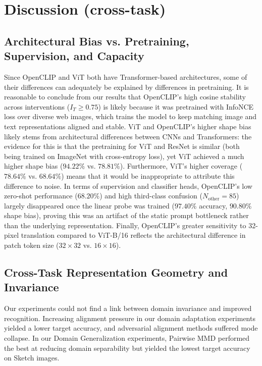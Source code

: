 \documentclass{article}
\begin{document}
\newpage
\section{Discussion (cross-task)}
\label{sec:discussion}

\subsection{Architectural Bias vs. Pretraining, Supervision, and Capacity}
Since OpenCLIP and ViT both have Transformer-based architectures, some of their differences can adequately be explained by differences in pretraining. It is reasonable to conclude from our results that OpenCLIP's high cosine stability across interventions ($I_T \ge 0.75$) is likely because it was pretrained with InfoNCE loss over diverse web images, which trains the model to keep matching image and text representations aligned and stable. ViT and OpenCLIP's higher shape bias likely stems from architectural differences between CNNs and Transformers: the evidence for this is that the pretraining for ViT and ResNet is similar (both being trained on ImageNet with cross-entropy loss), yet ViT achieved a much higher shape bias ($94.22\%$ vs. $78.81\%$). Furthermore, ViT's higher coverage ($78.64\%$ vs. $68.64\%$) means that it would be inappropriate to attribute this difference to noise. In terms of supervision and classifier heads, OpenCLIP's low zero-shot performance ($68.20\%$) and high third-class confusion ($N_{\text{other}}=85$) largely disappeared once the linear probe was trained ($97.40\%$ accuracy, $90.80\%$ shape bias), proving this was an artifact of the static prompt bottleneck rather than the underlying representation. Finally, OpenCLIP's greater sensitivity to 32-pixel translation compared to ViT-B/16 reflects the architectural difference in patch token size ($32 \times 32$ vs. $16 \times 16$).

\subsection{Cross-Task Representation Geometry and Invariance}
Our experiments could not find a link between domain invariance and improved recognition. Increasing alignment pressure in our domain adaptation experiments yielded a lower target accuracy, and adversarial alignment methods suffered mode collapse. In our Domain Generalization experiments, Pairwise MMD performed the best at reducing domain separability but yielded the lowest target accuracy on Sketch images. 
\end{document}
